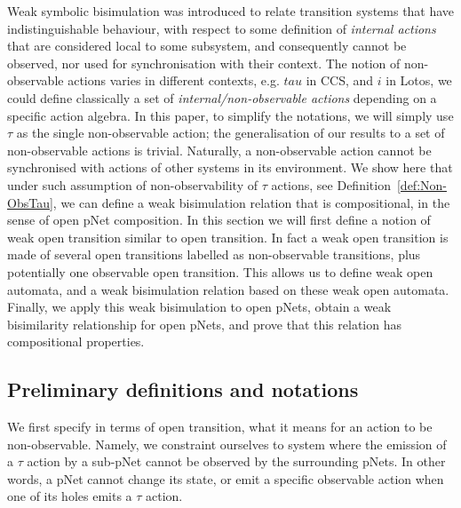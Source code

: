 \documentclass{lmcs}
\newcommand{\TODO}[1]{\textcolor{red}{\textbf{[TODO:#1]}}}
\begin{document}
Weak symbolic bisimulation was introduced to relate transition systems
that have indistinguishable behaviour, with respect to some definition
of \emph{internal actions} that are considered local to some
subsystem, and consequently cannot be observed, nor used for
synchronisation with their context.
The notion of non-observable actions varies in different contexts,
e.g. $tau$ in CCS, and $i$ in Lotos, we could define classically a set of
\emph{internal/non-observable actions} depending on a specific action
algebra. In this paper, to simplify the notations, we will simply use $\tau$ as the single non-observable action; the generalisation of our results to a set of non-observable actions is trivial. 
Naturally, a non-observable action cannot be synchronised with
actions of other systems in its environment. 
We show here that under such assumption of non-observability of $\tau$ actions, see Definition~\ref{def:Non-ObsTau}, we can define a weak bisimulation relation that is compositional, in the sense of open pNet composition. In this section we will first define a notion of weak open transition similar to open transition. In fact a weak open transition is made of several open transitions labelled as non-observable transitions, plus potentially one observable open transition. This allows us to define weak open automata, and a weak bisimulation relation based on these weak open automata. Finally, we apply this weak bisimulation to open pNets, obtain a weak bisimilarity relationship for open pNets, and prove that this relation has compositional properties.



\subsection{Preliminary definitions and notations}


We first specify in terms of open transition, what it means for an action to be non-observable. Namely, we constraint ourselves to system where the emission of a $\tau$ action by a sub-pNet cannot be observed by the surrounding pNets. In other words, a pNet cannot change its state, or emit a specific observable action when one of its holes emits a $\tau$ action.
\end{document}
